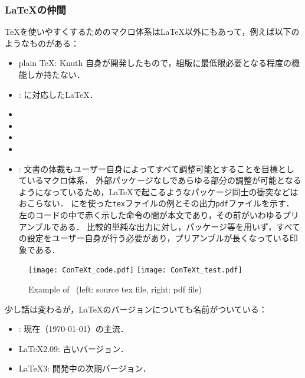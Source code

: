 \documentclass[./main]{subfiles}
\begin{document}
\subsubsection{\LaTeX の仲間}
\noindent
\TeX を使いやすくするためのマクロ体系は\LaTeX 以外にもあって，例えば以下のようなものがある：
\begin{itemize}
  \item plain \TeX : Knuth 自身が開発したもので，組版に最低限必要となる程度の機能しか持たない．
  \item \pLaTeX : \pTeX に対応した\LaTeX．
  \item \upLaTeX
  \item \pdfLaTeX
  \item \XeLaTeX
  \item \LuaLaTeX
  \item \ConTeXt : 文書の体裁もユーザー自身によってすべて調整可能とすることを目標としているマクロ体系\supercite{ConTeXt_TeXWiki}．
  外部パッケージなしであらゆる部分の調整が可能となるようになっているため，\LaTeX で起こるようなパッケージ同士の衝突などはおこらない．
  に\ConTeXt を使った\verb|tex|ファイルの例とその出力\verb|pdf|ファイルを示す．
  左のコードの中で赤く示した命令の間が本文であり，その前がいわゆるプリアンブルである．
  比較的単純な出力に対し，パッケージ等を用いず，すべての設定をユーザー自身が行う必要があり，プリアンブルが長くなっている印象である．
\end{itemize}
\begin{figure}[tbph]
  \centering
  \texttt{[image: ConTeXt\_code.pdf]}
  \texttt{[image: ConTeXt\_test.pdf]}
  \caption{Example of \ConTeXt\ (left: source tex file, right: pdf file)}
  \label{fig:ConTeXt_test}
\end{figure}

少し話は変わるが，\LaTeX のバージョンについても名前がついている：
\begin{itemize}
  \item \LaTeXe : 現在（{\today}）の主流．
  \item \LaTeX 2.09: 古いバージョン．
  \item \LaTeX 3: 開発中の次期バージョン．
\end{itemize}
\end{document}
